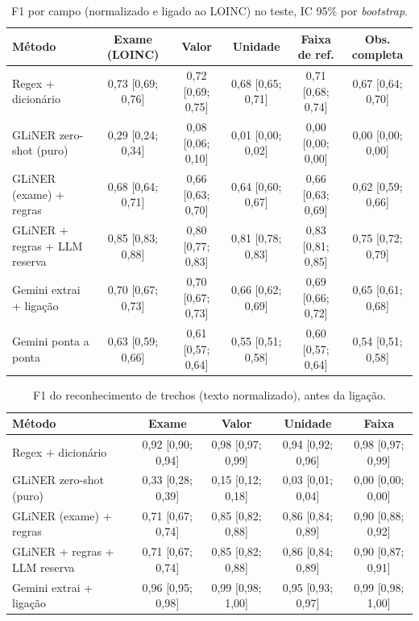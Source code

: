 \begin{table}[ht]\centering\small
\caption{F1 por campo (normalizado e ligado ao LOINC) no teste, IC 95\% por \textit{bootstrap}.}\label{tab:campos}
\begin{tabular}{lccccc}\toprule
Método & Exame (LOINC) & Valor & Unidade & Faixa de ref. & Obs. completa\\\midrule
Regex + dicionário & 0,73 [0,69; 0,76] & 0,72 [0,69; 0,75] & 0,68 [0,65; 0,71] & 0,71 [0,68; 0,74] & 0,67 [0,64; 0,70]\\
GLiNER zero-shot (puro) & 0,29 [0,24; 0,34] & 0,08 [0,06; 0,10] & 0,01 [0,00; 0,02] & 0,00 [0,00; 0,00] & 0,00 [0,00; 0,00]\\
GLiNER (exame) + regras & 0,68 [0,64; 0,71] & 0,66 [0,63; 0,70] & 0,64 [0,60; 0,67] & 0,66 [0,63; 0,69] & 0,62 [0,59; 0,66]\\
GLiNER + regras + LLM reserva & 0,85 [0,83; 0,88] & 0,80 [0,77; 0,83] & 0,81 [0,78; 0,83] & 0,83 [0,81; 0,85] & 0,75 [0,72; 0,79]\\
Gemini extrai + ligação & 0,70 [0,67; 0,73] & 0,70 [0,67; 0,73] & 0,66 [0,62; 0,69] & 0,69 [0,66; 0,72] & 0,65 [0,61; 0,68]\\
Gemini ponta a ponta & 0,63 [0,59; 0,66] & 0,61 [0,57; 0,64] & 0,55 [0,51; 0,58] & 0,60 [0,57; 0,64] & 0,54 [0,51; 0,58]\\
\bottomrule\end{tabular}\end{table}

\begin{table}[ht]\centering\small
\caption{F1 do reconhecimento de trechos (texto normalizado), antes da ligação.}\label{tab:spans}
\begin{tabular}{lcccc}\toprule
Método & Exame & Valor & Unidade & Faixa\\\midrule
Regex + dicionário & 0,92 [0,90; 0,94] & 0,98 [0,97; 0,99] & 0,94 [0,92; 0,96] & 0,98 [0,97; 0,99]\\
GLiNER zero-shot (puro) & 0,33 [0,28; 0,39] & 0,15 [0,12; 0,18] & 0,03 [0,01; 0,04] & 0,00 [0,00; 0,00]\\
GLiNER (exame) + regras & 0,71 [0,67; 0,74] & 0,85 [0,82; 0,88] & 0,86 [0,84; 0,89] & 0,90 [0,88; 0,92]\\
GLiNER + regras + LLM reserva & 0,71 [0,67; 0,74] & 0,85 [0,82; 0,88] & 0,86 [0,84; 0,89] & 0,90 [0,87; 0,91]\\
Gemini extrai + ligação & 0,96 [0,95; 0,98] & 0,99 [0,98; 1,00] & 0,95 [0,93; 0,97] & 0,99 [0,98; 1,00]\\
\bottomrule\end{tabular}\end{table}

